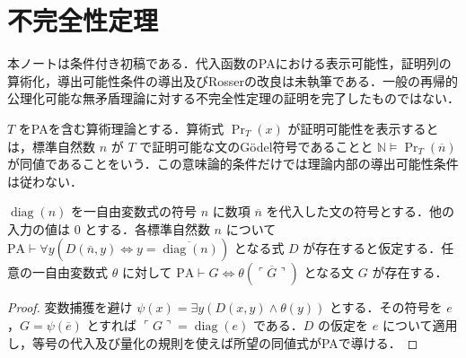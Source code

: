 \section{不完全性定理}
本ノートは条件付き初稿である．代入函数のPAにおける表示可能性，証明列の算術化，導出可能性条件の導出及びRosserの改良は未執筆である．一般の再帰的公理化可能な無矛盾理論に対する不完全性定理の証明を完了したものではない．
\begin{defn}[証明可能性述語]
$T$ をPAを含む算術理論とする．算術式 $\operatorname{Pr}_T(x)$ が証明可能性を表示するとは，標準自然数 $n$ が $T$ で証明可能な文のGödel符号であることと $\mathbb N\models\operatorname{Pr}_T(\overline n)$ が同値であることをいう．この意味論的条件だけでは理論内部の導出可能性条件は従わない．
\end{defn}
\begin{prop}
$\operatorname{diag}(n)$ を一自由変数式の符号 $n$ に数項 $\overline n$ を代入した文の符号とする．他の入力の値は $0$ とする．各標準自然数 $n$ について $\mathrm{PA}\vdash\forall y(D(\overline n,y)\Leftrightarrow y=\overline{\operatorname{diag}(n)})$ となる式 $D$ が存在すると仮定する．任意の一自由変数式 $\theta$ に対して $\mathrm{PA}\vdash G\Leftrightarrow\theta(\overline{\ulcorner G\urcorner})$ となる文 $G$ が存在する．
\end{prop}
\begin{proof}
変数捕獲を避け $\psi(x)=\exists y(D(x,y)\land\theta(y))$ とする．その符号を $e$，$G=\psi(\overline e)$ とすれば $\ulcorner G\urcorner=\operatorname{diag}(e)$ である．$D$ の仮定を $e$ について適用し，等号の代入及び量化の規則を使えば所望の同値式がPAで導ける．
\end{proof}
